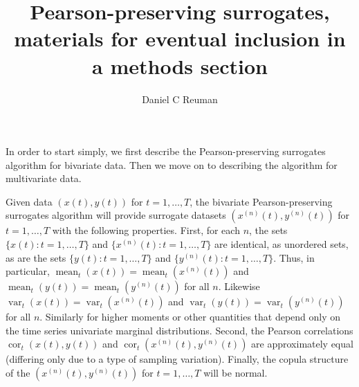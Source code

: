 \documentclass[letterpaper,12pt]{article}
\newcommand{\mean}{\operatorname{mean}}
\newcommand{\var}{\operatorname{var}}
\newcommand{\cor}{\operatorname{cor}}
\begin{document}
\title{Pearson-preserving surrogates, materials for eventual inclusion in a methods section}
\author{Daniel C Reuman}
\maketitle



\noindent In order to start simply, we first describe the Pearson-preserving surrogates 
algorithm for bivariate data. Then we move on to describing the algorithm
for multivariate data. 

Given data $(x(t),y(t))$ for $t=1,\ldots,T$, the bivariate
Pearson-preserving surrogates algorithm will provide surrogate datasets
$(x^{(n)}(t),y^{(n)}(t))$ for $t=1,\ldots,T$ with the following properties.
First, for each $n$,
the sets $\{x(t) : t=1,\ldots,T\}$ and $\{x^{(n)}(t) : t=1,\ldots,T\}$
are identical, as unordered sets, as are the sets 
$\{y(t) : t=1,\ldots,T\}$ and $\{y^{(n)}(t) : t=1,\ldots,T\}$. Thus,
in particular, $\mean_t(x(t))=\mean_t(x^{(n)}(t))$ and 
$\mean_t(y(t))=\mean_t(y^{(n)}(t))$ for all $n$. Likewise
$\var_t(x(t))=\var_t(x^{(n)}(t))$ and 
$\var_t(y(t))=\var_t(y^{(n)}(t))$ for all $n$. Similarly for
higher moments or other quantities that depend only on the time series
univariate marginal distributions.
Second, the Pearson correlations $\cor_t(x(t),y(t))$
and $\cor_t(x^{(n)}(t),y^{(n)}(t))$ are approximately equal (differing 
only due to a type of sampling variation). Finally, the copula 
structure of the $(x^{(n)}(t),y^{(n)}(t))$ for $t=1,\ldots,T$
will be normal.
\end{document}
